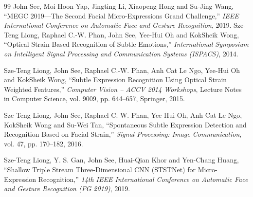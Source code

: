 \documentclass[11pt,a4paper]{article}
\numberwithin{equation}{section}
\begin{document}
\begin{thebibliography}{99}
John See, Moi Hoon Yap, Jingting Li, Xiaopeng Hong and Su-Jing Wang,
``MEGC 2019---The Second Facial Micro-Expressions Grand Challenge,''
\emph{IEEE International Conference on Automatic Face and Gesture
Recognition}, 2019.
Sze-Teng Liong, Raphael C.-W. Phan, John See, Yee-Hui Oh and KokSheik Wong,
``Optical Strain Based Recognition of Subtle Emotions,'' \emph{International
Symposium on Intelligent Signal Processing and Communication Systems
(ISPACS)}, 2014.

Sze-Teng Liong, John See, Raphael C.-W. Phan, Anh Cat Le Ngo, Yee-Hui Oh and
KokSheik Wong, ``Subtle Expression Recognition Using Optical Strain Weighted
Features,'' \emph{Computer Vision -- ACCV 2014 Workshops}, Lecture Notes in
Computer Science, vol. 9009, pp. 644--657, Springer, 2015.

Sze-Teng Liong, John See, Raphael C.-W. Phan, Yee-Hui Oh, Anh Cat Le Ngo,
KokSheik Wong and Su-Wei Tan, ``Spontaneous Subtle Expression Detection and
Recognition Based on Facial Strain,'' \emph{Signal Processing: Image
Communication}, vol. 47, pp. 170--182, 2016.

Sze-Teng Liong, Y. S. Gan, John See, Huai-Qian Khor and Yen-Chang Huang,
``Shallow Triple Stream Three-Dimensional CNN (STSTNet) for Micro-Expression
Recognition,'' \emph{14th IEEE International Conference on Automatic Face and
Gesture Recognition (FG 2019)}, 2019.

\end{thebibliography}
\end{document}
